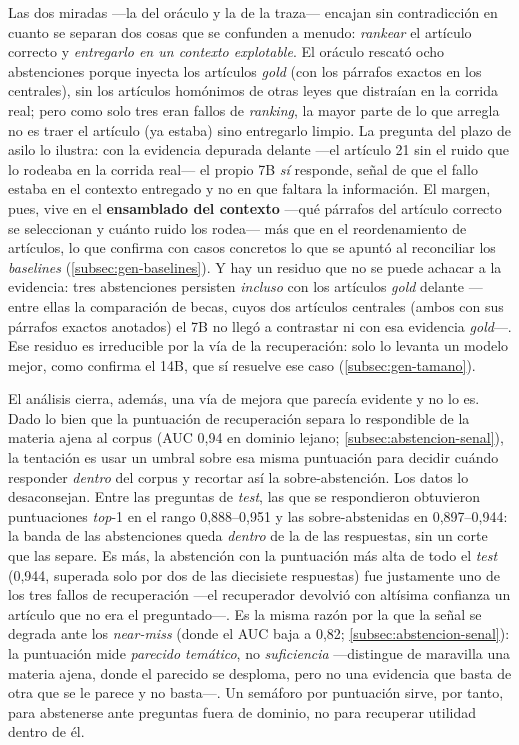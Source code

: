 Las dos miradas —la del oráculo y la de la traza— encajan sin contradicción en cuanto se separan dos cosas que se confunden a menudo: \emph{rankear} el artículo correcto y \emph{entregarlo en un contexto explotable}. El oráculo rescató ocho abstenciones porque inyecta los artículos \emph{gold} (con los párrafos exactos en los centrales), sin los artículos homónimos de otras leyes que distraían en la corrida real; pero como solo tres eran fallos de \emph{ranking}, la mayor parte de lo que arregla no es traer el artículo (ya estaba) sino entregarlo limpio. La pregunta del plazo de asilo lo ilustra: con la evidencia depurada delante —el artículo 21 sin el ruido que lo rodeaba en la corrida real— el propio 7B \emph{sí} responde, señal de que el fallo estaba en el contexto entregado y no en que faltara la información. El margen, pues, vive en el \textbf{ensamblado del contexto} —qué párrafos del artículo correcto se seleccionan y cuánto ruido los rodea— más que en el reordenamiento de artículos, lo que confirma con casos concretos lo que se apuntó al reconciliar los \emph{baselines} (\ref{subsec:gen-baselines}). Y hay un residuo que no se puede achacar a la evidencia: tres abstenciones persisten \emph{incluso} con los artículos \emph{gold} delante —entre ellas la comparación de becas, cuyos dos artículos centrales (ambos con sus párrafos exactos anotados) el 7B no llegó a contrastar ni con esa evidencia \emph{gold}—. Ese residuo es irreducible por la vía de la recuperación: solo lo levanta un modelo mejor, como confirma el 14B, que sí resuelve ese caso (\ref{subsec:gen-tamano}).

El análisis cierra, además, una vía de mejora que parecía evidente y no lo es. Dado lo bien que la puntuación de recuperación separa lo respondible de la materia ajena al corpus (AUC 0,94 en dominio lejano; \ref{subsec:abstencion-senal}), la tentación es usar un umbral sobre esa misma puntuación para decidir cuándo responder \emph{dentro} del corpus y recortar así la sobre-abstención. Los datos lo desaconsejan. Entre las preguntas de \emph{test}, las que se respondieron obtuvieron puntuaciones \emph{top}-1 en el rango 0,888--0,951 y las sobre-abstenidas en 0,897--0,944: la banda de las abstenciones queda \emph{dentro} de la de las respuestas, sin un corte que las separe. Es más, la abstención con la puntuación más alta de todo el \emph{test} (0,944, superada solo por dos de las diecisiete respuestas) fue justamente uno de los tres fallos de recuperación —el recuperador devolvió con altísima confianza un artículo que no era el preguntado—. Es la misma razón por la que la señal se degrada ante los \emph{near-miss} (donde el AUC baja a 0,82; \ref{subsec:abstencion-senal}): la puntuación mide \emph{parecido temático}, no \emph{suficiencia} —distingue de maravilla una materia ajena, donde el parecido se desploma, pero no una evidencia que basta de otra que se le parece y no basta—. Un semáforo por puntuación sirve, por tanto, para abstenerse ante preguntas fuera de dominio, no para recuperar utilidad dentro de él.

